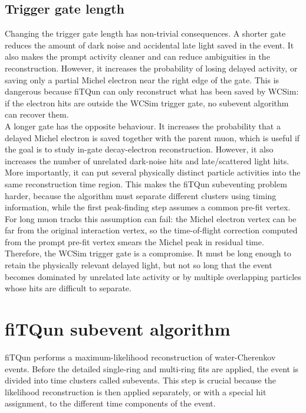 \documentclass{article}
\numberwithin{table}{subsection}
\numberwithin{figure}{subsection}
\numberwithin{equation}{subsection}
\numberwithin{footnote}{subsection}
\begin{document}
\subsection{Trigger gate length}
Changing the trigger gate length has non-trivial consequences. A shorter
gate reduces the amount of dark noise and accidental late light saved in the
event. It also makes the prompt activity cleaner and can reduce ambiguities
in the reconstruction. However, it increases the probability of losing delayed
activity, or saving only a partial Michel electron near the right edge of the
gate. This is dangerous because fiTQun can only reconstruct what has been
saved by WCSim: if the electron hits are outside the WCSim trigger gate, no
subevent algorithm can recover them.\\
A longer gate has the opposite behaviour. It increases the probability that a
delayed Michel electron is saved together with the parent muon, which is
useful if the goal is to study in-gate decay-electron reconstruction. However,
it also increases the number of unrelated dark-noise hits and late/scattered
light hits. More importantly, it can put several physically distinct particle
activities into the same reconstruction time region. This makes the fiTQun
subeventing problem harder, because the algorithm must separate different
clusters using timing information, while the first peak-finding step assumes a
common pre-fit vertex. For long muon tracks this assumption can fail: the
Michel electron vertex can be far from the original interaction vertex, so the
time-of-flight correction computed from the prompt pre-fit vertex smears the
Michel peak in residual time.\\
Therefore, the WCSim trigger gate is a compromise. It must be long enough
to retain the physically relevant delayed light, but not so long that the
event becomes dominated by unrelated late activity or by multiple
overlapping particles whose hits are difficult to separate.

\section{fiTQun subevent algorithm}
\label{sec:fitqun_subevent_algorithm}

fiTQun performs a maximum-likelihood reconstruction of water-Cherenkov
events. Before the detailed single-ring and multi-ring fits are applied, the
event is divided into time clusters called subevents. This step is
crucial because the likelihood reconstruction is then applied separately, or
with a special hit assignment, to the different time components of the event.
\end{document}
